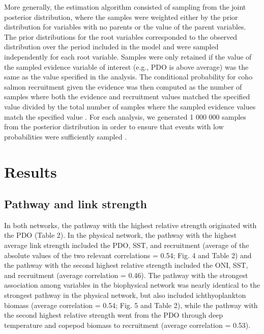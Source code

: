 More generally, the estimation algorithm consisted of sampling from the joint
posterior distribution, where the samples were weighted either by the prior
distribution for variables with no parents or the value of the parent variables.
The prior distributions for the root variables corresponded to the observed
distribution over the period included in the model and were sampled
independently for each root variable. Samples were only retained if the value of
the sampled evidence variable of interest (e.g., PDO is above average) was the
same as the value specified in the analysis. The conditional probability for
coho salmon recruitment given the evidence was then computed as the number of
samples where both the evidence and recruitment values matched the specified
value divided by the total number of samples where the sampled evidence values
match the specified value \citep{Henrion1988a}. For each analysis, we generated
1 000 000 samples from the posterior distribution in order to ensure that events
with low probabilities were sufficiently sampled \citep{Koller2009a}.



\section{Results}

\subsection{Pathway and link strength}

In both networks, the pathway with the highest relative strength originated with
the PDO (Table 2). In the physical network, the pathway with the highest average
link strength included the PDO, SST, and recruitment (average of the absolute
values of the two relevant correlations = 0.54; Fig. 4 and Table 2) and the
pathway with the second highest relative strength included the ONI, SST, and
recruitment (average correlation = 0.46). The pathway with the strongest
association among variables in the biophysical network was nearly identical to
the strongest pathway in the physical network, but also included ichthyoplankton
biomass (average correlation = 0.54; Fig. 5 and Table 2), while the pathway with
the second highest relative strength went from the PDO through deep temperature
and copepod biomass to recruitment (average correlation = 0.53).

